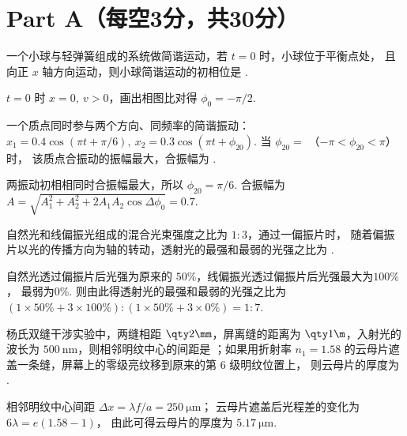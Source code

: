 \section{Part A（每空3分，共30分）}

\begin{problem}
  一个小球与轻弹簧组成的系统做简谐运动，若 $t = 0$ 时，小球位于平衡点处，
  且向正 $x$ 轴方向运动，则小球简谐运动的初相位是 .
\end{problem}
\begin{solution}
  $t = 0$ 时 $x = 0,~ v > 0$，画出相图比对得 $\phi_0 = -\pi/2$.
\end{solution}

\begin{problem}
  一个质点同时参与两个方向、同频率的简谐振动：
  $x_1 = 0.4\cos(\pi t + \pi/6),~ x_2 = 0.3\cos(\pi t + \phi_{20})$.
  当 $\phi_{20} = $ （$-\pi < \phi_{20} < \pi$）时，
  该质点合振动的振幅最大，合振幅为 .
\end{problem}
\begin{solution}
  两振动初相相同时合振幅最大，所以 $\phi_{20} = \pi/6$. 合振幅为
  $A = \sqrt{A_1^2 + A_2^2 + 2A_1A_2\cos\Delta\phi_0} = 0.7$.
\end{solution}

\begin{problem}
  自然光和线偏振光组成的混合光束强度之比为 $1:3$，通过一偏振片时，
  随着偏振片以光的传播方向为轴的转动，透射光的最强和最弱的光强之比为 .
\end{problem}
\begin{solution}
  自然光透过偏振片后光强为原来的 $50\%$，线偏振光透过偏振片后光强最大为$100\%$，
  最弱为$0\%$. 则由此得透射光的最强和最弱的光强之比为
  $(1 \times 50\% + 3 \times 100\%):(1 \times 50\% + 3 \times 0\%) = 1:7$.
\end{solution}

\begin{problem}
  杨氏双缝干涉实验中，两缝相距 $\qty2\mm$，屏离缝的距离为 $\qty1\m$，入射光的波长为
  $\qty{500}\nm$，则相邻明纹中心的间距是 ；如果用折射率
  $n_1 = 1.58$ 的云母片遮盖一条缝，屏幕上的零级亮纹移到原来的第 $6$ 级明纹位置上，
  则云母片的厚度为 .
\end{problem}
\begin{solution}
  相邻明纹中心间距 $\Delta x = \lambda f/a = \qty{250}\um$；
  云母片遮盖后光程差的变化为 $6\lambda = e(1.58 - 1)$，
  由此可得云母片的厚度为 $\qty{5.17}\um$.
\end{solution}

